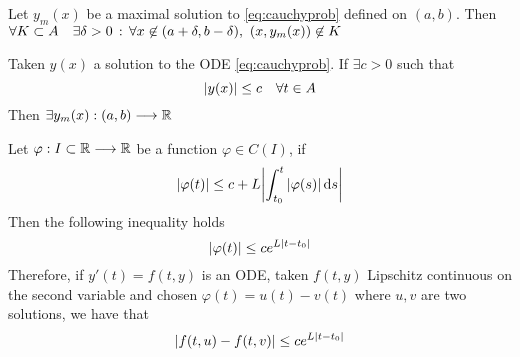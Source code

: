 \documentclass[../complete.tex]{subfiles}
\begin{document}
\begin{thm}
	Let $y_m(x)$ be a maximal solution to \eqref{eq:cauchyprob} defined on $(a,b)$. Then $\forall K\subset A\quad\exists\delta>0\st\forall x\not\in(a+\delta,b-\delta),\ (x,y_m(x))\not\in K$
\end{thm}
\begin{thm}
	Taken $y(x)$ a solution to the ODE \eqref{eq:cauchyprob}. If $\exists c>0$ such that
	\begin{equation*}
		\abs{y(x)}\le c\quad\forall t\in A
	\end{equation*}
	Then $\exists y_m(x):(a,b)\overset{}{\longrightarrow}\mathbb{R}$
\end{thm}
\begin{lem}
	Let $\varphi:I\subset\mathbb{R}\overset{}{\longrightarrow}\mathbb{R}$ be a function $\varphi\in C(I)$, if
	\begin{equation*}
		\abs{\varphi(t)}\le c+L\abs{\int_{t_0}^{t}\abs{\varphi(s)}\operatorname{d\!} s}
	\end{equation*}
	Then the following inequality holds
	\begin{equation*}
		\abs{\varphi(t)}\le ce^{L\abs{t-t_0}}
	\end{equation*}
	Therefore, if $y'(t)=f(t,y)$ is an ODE, taken $f(t,y)$ Lipschitz continuous on the second variable and chosen $\varphi(t)=u(t)-v(t)$ where $u,v$ are two solutions, we have that
	\begin{equation*}
		\abs{f(t,u)-f(t,v)}\le ce^{L\abs{t-t_0}}
	\end{equation*}
\end{lem}
\end{document}
